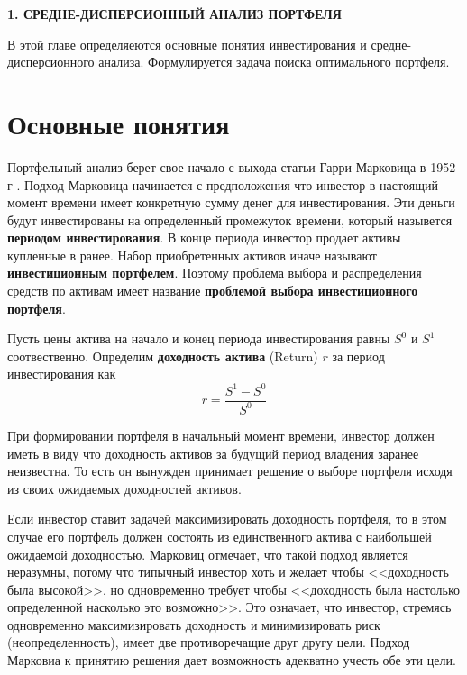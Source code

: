 \newpage
\begin{center}
	\textbf{\large 1. СРЕДНЕ-ДИСПЕРСИОННЫЙ АНАЛИЗ ПОРТФЕЛЯ}
\end{center}

В этой главе определяеются основные понятия инвестирования и средне-дисперсионного анализа.
Формулируется задача поиска оптимального портфеля.

\section{Основные понятия}

Портфельный анализ берет свое начало с выхода статьи Гарри Марковица в 1952 г \cite{markowitz}. Подход Марковица начинается с предположения что инвестор в 
настоящий момент времени имеет конкретную сумму денег для инвестирования. Эти деньги будут инвестированы на определенный промежуток
времени, который назывется \textbf{периодом инвестирования}. В конце периода инвестор продает активы купленные в
ранее. 
Набор приобретенных активов иначе называют \textbf{инвестиционным портфелем}. Поэтому проблема выбора и распределения
средств по активам имеет название \textbf{проблемой выбора инвестиционного портфеля}.

Пусть цены актива на начало и конец периода инвестирования равны $S^0$ и $S^1$ соотвественно.
Определим \textbf{доходность актива} (Return) $r$ за период инвестирования как
\[
	r = \frac{S^1 - S^0}{S^0}
\]

При формировании портфеля в начальный момент времени, инвестор должен иметь в виду что доходность активов
за будущий период владения заранее неизвестна. То есть он вынужден принимает решение о выборе портфеля исходя из 
своих ожидаемых доходностей активов. 

Если инвестор ставит задачей максимизировать доходность портфеля, то в этом случае его портфель должен состоять из единственного
актива с наибольшей ожидаемой доходностью. Марковиц отмечает, что такой подход является неразумны, потому что типычный инвестор
хоть и желает чтобы <<доходность была высокой>>, но одновременно требует чтобы <<доходность была настолько определенной насколько
это возможно>>. Это означает, что инвестор, стремясь одновременно максимизировать доходность и минимизировать риск 
(неопределенность), имеет две противоречащие друг другу цели. Подход Марковиа к принятию решения дает возможность адекватно 
учесть обе эти цели.

